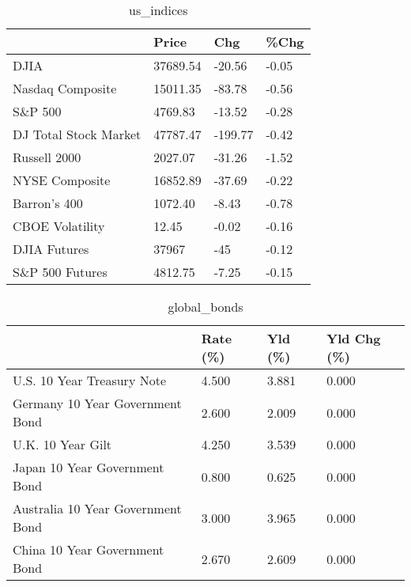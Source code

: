 \documentclass{article}%
\begin{document}
%


\begin{table}[htbp]%
\caption{us\_indices}%
\centering%
\begin{adjustbox}{width=1\textwidth}%
\begin{tabular}{llll}
\toprule
                      &    Price &     Chg &  \%Chg \\
\midrule
                 DJIA & 37689.54 &  -20.56 & -0.05 \\
     Nasdaq Composite & 15011.35 &  -83.78 & -0.56 \\
              S\&P 500 &  4769.83 &  -13.52 & -0.28 \\
DJ Total Stock Market & 47787.47 & -199.77 & -0.42 \\
         Russell 2000 &  2027.07 &  -31.26 & -1.52 \\
       NYSE Composite & 16852.89 &  -37.69 & -0.22 \\
         Barron's 400 &  1072.40 &   -8.43 & -0.78 \\
      CBOE Volatility &    12.45 &   -0.02 & -0.16 \\
         DJIA Futures &    37967 &     -45 & -0.12 \\
      S\&P 500 Futures &  4812.75 &   -7.25 & -0.15 \\
\bottomrule
\end{tabular}
%
\end{adjustbox}%
\end{table}

%


\begin{table}[htbp]%
\caption{global\_bonds}%
\centering%
\begin{adjustbox}{width=1\textwidth}%
\begin{tabular}{llll}
\toprule
                                  & Rate (\%) & Yld (\%) & Yld Chg (\%) \\
\midrule
       U.S. 10 Year Treasury Note &    4.500 &   3.881 &       0.000 \\
  Germany 10 Year Government Bond &    2.600 &   2.009 &       0.000 \\
                U.K. 10 Year Gilt &    4.250 &   3.539 &       0.000 \\
    Japan 10 Year Government Bond &    0.800 &   0.625 &       0.000 \\
Australia 10 Year Government Bond &    3.000 &   3.965 &       0.000 \\
    China 10 Year Government Bond &    2.670 &   2.609 &       0.000 \\
\bottomrule
\end{tabular}
%
\end{adjustbox}%
\end{table}
\end{document}
